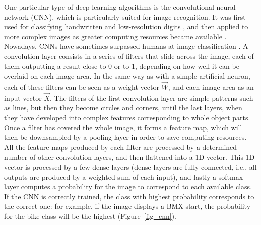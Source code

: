 One particular type of deep learning algorithms is the convolutional neural network (CNN), which is particularly suited for image recognition. It was first used for classifying handwritten and low-resolution digits \cite{LeCun1998}, and then applied to more complex images as greater computing resources became available \cite{Krizhevsky2017}. Nowadays, CNNs have sometimes surpassed humans at image classification \cite{Cireşan2012, Lu2015}. A convolution layer consists in a series of filters that slide across the image, each of them outputting a result close to 0 or to 1, depending on how well it can be overlaid on each image area. In the same way as with a simple artificial neuron, each of these filters can be seen as a weight vector \(\overrightarrow{W}\), and each image area as an input vector \(\overrightarrow{X}\). The filters of the first convolution layer are simple patterns such as lines, but then they become circles and corners, until the last layers, when they have developed into complex features corresponding to whole object parts. Once a filter has covered the whole image, it forms a feature map, which will then be downsampled by a pooling layer in order to save computing resources. All the feature maps produced by each filter are processed by a determined number of other convolution layers, and then flattened into a 1D vector. This 1D vector is processed by a few dense layers (dense layers are fully connected, i.e., all outputs are produced by a weighted sum of each input), and lastly a softmax layer computes a probability for the image to correspond to each available class. If the CNN is correctly trained, the class with highest probability corresponds to the correct one: for example, if the image displays a BMX start, the probability for the bike class will be the highest (Figure~\ref{fig_cnn}). 

